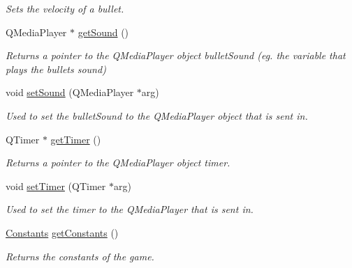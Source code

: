 \begin{DoxyCompactItemize}
\begin{DoxyCompactList}\small\item\em Sets the velocity of a bullet. \end{DoxyCompactList}\item 
\mbox{\label{classBullet_a87d32d76ae8f43839013eea1cfc07625}} 
Q\+Media\+Player $\ast$ \hyperlink{classBullet_a87d32d76ae8f43839013eea1cfc07625}{get\+Sound} ()
\begin{DoxyCompactList}\small\item\em Returns a pointer to the Q\+Media\+Player object bullet\+Sound (eg. the variable that plays the bullet\textquotesingle{}s sound) \end{DoxyCompactList}\item 
\mbox{\label{classBullet_a07e1aa135f6eafc3c2b1b2938138d1fe}} 
void \hyperlink{classBullet_a07e1aa135f6eafc3c2b1b2938138d1fe}{set\+Sound} (Q\+Media\+Player $\ast$arg)
\begin{DoxyCompactList}\small\item\em Used to set the bullet\+Sound to the Q\+Media\+Player object that is sent in. \end{DoxyCompactList}\item 
\mbox{\label{classBullet_a6266a742a36672d1b023652f3ece4905}} 
Q\+Timer $\ast$ \hyperlink{classBullet_a6266a742a36672d1b023652f3ece4905}{get\+Timer} ()
\begin{DoxyCompactList}\small\item\em Returns a pointer to the Q\+Media\+Player object timer. \end{DoxyCompactList}\item 
\mbox{\label{classBullet_aa1e71a5ffbf610056f80bb54f2cde99f}} 
void \hyperlink{classBullet_aa1e71a5ffbf610056f80bb54f2cde99f}{set\+Timer} (Q\+Timer $\ast$arg)
\begin{DoxyCompactList}\small\item\em Used to set the timer to the Q\+Media\+Player that is sent in. \end{DoxyCompactList}\item 
\mbox{\label{classBullet_a2a2d4ad5cca3dddb9eff382d7d1e4a1f}} 
\hyperlink{structConstants}{Constants} \hyperlink{classBullet_a2a2d4ad5cca3dddb9eff382d7d1e4a1f}{get\+Constants} ()
\begin{DoxyCompactList}\small\item\em Returns the constants of the game. \end{DoxyCompactList}\item 

\end{DoxyCompactItemize}
